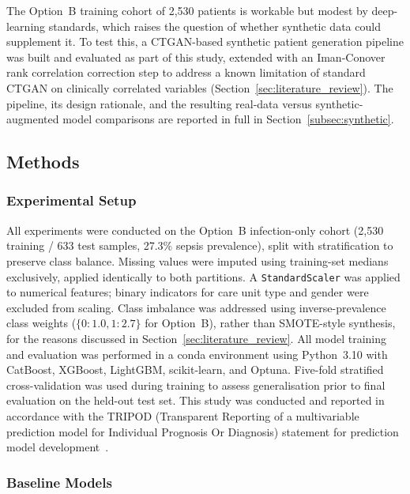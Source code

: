 \documentclass[final,3p,times]{elsarticle}
\begin{document}
The Option~B training cohort of 2,530 patients is workable but
modest by deep-learning standards, which raises the question of
whether synthetic data could supplement it. To test this, a
CTGAN-based synthetic patient generation pipeline was built and
evaluated as part of this study, extended with an Iman-Conover
rank correlation correction step to address a known limitation of
standard CTGAN on clinically correlated variables (Section~\ref{sec:literature_review}).
The pipeline, its design rationale, and the resulting real-data
versus synthetic-augmented model comparisons are reported in full
in Section~\ref{subsec:synthetic}.

\subsection{Methods}
\label{subsec:methods_all}

\subsubsection{Experimental Setup}
\label{subsec:setup}

All experiments were conducted on the Option~B infection-only
cohort (2,530 training / 633 test samples, 27.3\% sepsis
prevalence), split with stratification to preserve class balance.
Missing values were imputed using training-set medians exclusively,
applied identically to both partitions. A \texttt{StandardScaler}
was applied to numerical features; binary indicators for care unit
type and gender were excluded from scaling. Class imbalance was
addressed using inverse-prevalence class weights
($\{0:1.0, 1:2.7\}$ for Option~B), rather than SMOTE-style
synthesis, for the reasons discussed in Section~\ref{sec:literature_review}.
All model training and evaluation was performed in a conda
environment using Python~3.10 with CatBoost, XGBoost, LightGBM,
scikit-learn, and Optuna. Five-fold stratified cross-validation was
used during training to assess generalisation prior to final
evaluation on the held-out test set. This study was conducted and
reported in accordance with the TRIPOD (Transparent Reporting of a
multivariable prediction model for Individual Prognosis Or
Diagnosis) statement for prediction model development~\cite{collins2015}.

\subsubsection{Baseline Models}
\label{subsec:baseline_methods}
\end{document}
